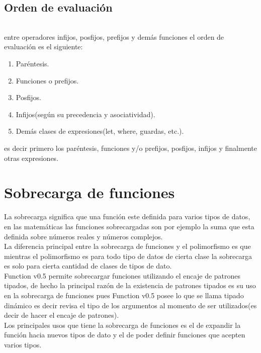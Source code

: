       \subsection*{Orden de evaluación}\texttt{~}\\
      
      entre operadores infijos, posfijos, prefijos y demás funciones el orden de evaluación es el siguiente:
      
      \begin{enumerate}
         \item Paréntesis.
         \item Funciones o prefijos.
         \item Posfijos.
         \item Infijos(según su precedencia y asociatividad).
         \item Demás clases de expresiones(let, where, guardas, etc.).
      \end{enumerate}
      
      es decir primero los paréntesis, funciones y/o prefijos, posfijos, infijos y finalmente otras expresiones.
      
   \section{Sobrecarga de funciones}
      La sobrecarga significa que una función este definida para varios tipos de datos, en las matemáticas las funciones sobrecargadas son por ejemplo la suma que esta definida sobre números reales y números complejos.
      \\
      
      La diferencia principal entre la sobrecarga de funciones y el polimorfismo es que mientras el polimorfismo es para todo tipo de datos de cierta clase la sobrecarga es solo para cierta cantidad de clases de tipos de dato.
      \\
      
      Function v0.5 permite sobrecargar funciones utilizando el encaje de patrones tipados, de hecho la principal razón de la existencia de patrones tipados es su uso en la sobrecarga de funciones pues Function v0.5 posee lo que se llama tipado dinámico es decir revisa el tipo de los argumentos al momento de ser utilizados(es decir de hacer el encaje de patrones).
      \\
      
      Los principales usos que tiene la sobrecarga de funciones es el de expandir la función hacia nuevos tipos de dato y el de poder definir funciones que acepten varios tipos.
      
